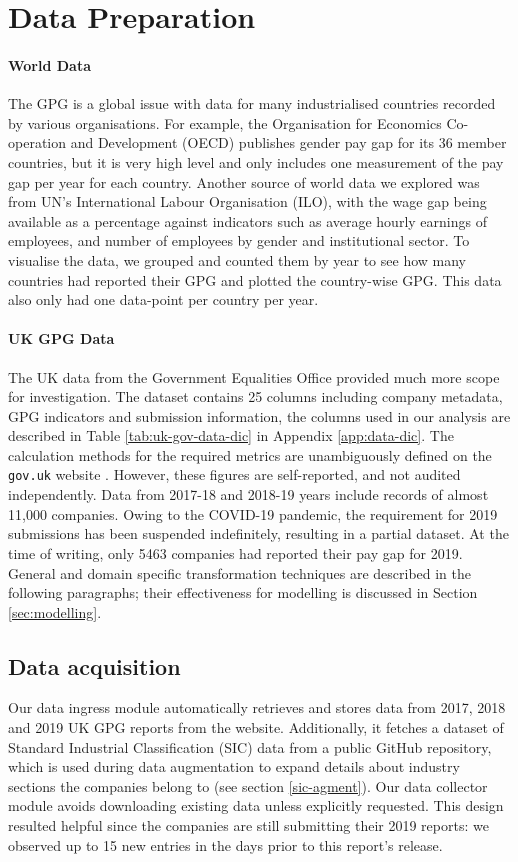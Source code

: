 \section{Data Preparation} 
\label{sec:data-prep}

\paragraph{World Data}
The GPG is a global issue with data for many industrialised countries recorded by various organisations. For example, the Organisation for Economics Co-operation and Development (OECD) publishes gender pay gap for its 36 member countries, but it is very high level and only includes one measurement of the pay gap per year for each country. Another source of world data we explored was from UN's International Labour Organisation (ILO), with the wage gap being available as a percentage against indicators such as average hourly earnings of employees, and number of employees by gender and institutional sector.
To visualise the data, we grouped and counted them by year to see how many countries had reported their GPG and plotted the country-wise GPG. This data also only had one data-point per country per year.

\paragraph{UK GPG Data}
The UK data from the Government Equalities Office provided much more scope for investigation.
The dataset contains 25 columns including company metadata, GPG indicators and submission information, the columns used in our analysis are described in Table \ref{tab:uk-gov-data-dic} in Appendix \ref{app:data-dic}.  The calculation methods for the required metrics are unambiguously defined on the \texttt{gov.uk} website \cite{govuk-how-to-calculate}. However, these figures are self-reported, and not audited independently. Data from 2017-18 and 2018-19 years include records of almost 11,000 companies. Owing to the COVID-19 pandemic, the requirement for 2019 submissions has been suspended indefinitely, resulting in a partial dataset. At the time of writing, only 5463 companies had reported their pay gap for 2019. General and domain specific transformation techniques are described in the following paragraphs; their effectiveness for modelling is discussed in Section \ref{sec:modelling}.

\subsection{Data acquisition}
Our data ingress module automatically retrieves and stores data from 2017, 2018 and 2019 UK GPG reports from the  website. Additionally, it fetches a dataset of Standard Industrial Classification (SIC) data from a public GitHub repository, which is used during data augmentation to expand details about industry sections the companies belong to (see section \ref{sic-agment}). Our data collector module avoids downloading existing data unless explicitly requested. This design resulted helpful since the companies are still submitting their 2019 reports: we observed up to 15 new entries in the days prior to this report's release.

